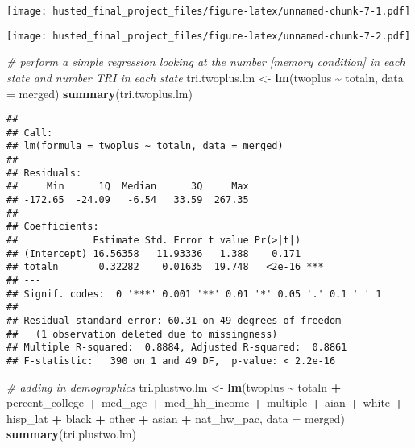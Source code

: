 \documentclass[
]{article}
\newenvironment{Shaded}{\begin{snugshade}}{\end{snugshade}}
\newcommand{\AttributeTok}[1]{\textcolor[rgb]{0.13,0.29,0.53}{#1}}
\newcommand{\CommentTok}[1]{\textcolor[rgb]{0.56,0.35,0.01}{\textit{#1}}}
\newcommand{\FunctionTok}[1]{\textcolor[rgb]{0.13,0.29,0.53}{\textbf{#1}}}
\newcommand{\NormalTok}[1]{#1}
\newcommand{\OtherTok}[1]{\textcolor[rgb]{0.56,0.35,0.01}{#1}}
\newcommand{\SpecialCharTok}[1]{\textcolor[rgb]{0.81,0.36,0.00}{\textbf{#1}}}
\begin{document}
\texttt{[image: husted\_final\_project\_files/figure-latex/unnamed-chunk-7-1.pdf]}

\begin{Shaded}
\end{Shaded}

\texttt{[image: husted\_final\_project\_files/figure-latex/unnamed-chunk-7-2.pdf]}

\begin{Shaded}
\begin{Highlighting}[]
\CommentTok{\# perform a simple regression looking at the number [memory condition] in each state and number TRI in each state}
\NormalTok{tri.twoplus.lm }\OtherTok{\textless{}{-}} \FunctionTok{lm}\NormalTok{(twoplus }\SpecialCharTok{\textasciitilde{}}\NormalTok{ totaln, }\AttributeTok{data =}\NormalTok{ merged)}
\FunctionTok{summary}\NormalTok{(tri.twoplus.lm)}
\end{Highlighting}
\end{Shaded}

\begin{verbatim}
## 
## Call:
## lm(formula = twoplus ~ totaln, data = merged)
## 
## Residuals:
##     Min      1Q  Median      3Q     Max 
## -172.65  -24.09   -6.54   33.59  267.35 
## 
## Coefficients:
##             Estimate Std. Error t value Pr(>|t|)    
## (Intercept) 16.56358   11.93336   1.388    0.171    
## totaln       0.32282    0.01635  19.748   <2e-16 ***
## ---
## Signif. codes:  0 '***' 0.001 '**' 0.01 '*' 0.05 '.' 0.1 ' ' 1
## 
## Residual standard error: 60.31 on 49 degrees of freedom
##   (1 observation deleted due to missingness)
## Multiple R-squared:  0.8884, Adjusted R-squared:  0.8861 
## F-statistic:   390 on 1 and 49 DF,  p-value: < 2.2e-16
\end{verbatim}

\begin{Shaded}
\begin{Highlighting}[]
\CommentTok{\# adding in demographics}
\NormalTok{tri.plustwo.lm }\OtherTok{\textless{}{-}} \FunctionTok{lm}\NormalTok{(twoplus }\SpecialCharTok{\textasciitilde{}}\NormalTok{ totaln }\SpecialCharTok{+}\NormalTok{ percent\_college }\SpecialCharTok{+}\NormalTok{ med\_age }\SpecialCharTok{+}\NormalTok{ med\_hh\_income }\SpecialCharTok{+}\NormalTok{ multiple }\SpecialCharTok{+}\NormalTok{ aian }\SpecialCharTok{+}\NormalTok{ white }\SpecialCharTok{+}\NormalTok{ hisp\_lat }\SpecialCharTok{+}\NormalTok{ black }\SpecialCharTok{+}\NormalTok{ other }\SpecialCharTok{+}\NormalTok{ asian }\SpecialCharTok{+}\NormalTok{ nat\_hw\_pac, }\AttributeTok{data =}\NormalTok{ merged)}
\FunctionTok{summary}\NormalTok{(tri.plustwo.lm)}
\end{Highlighting}
\end{Shaded}
\end{document}
